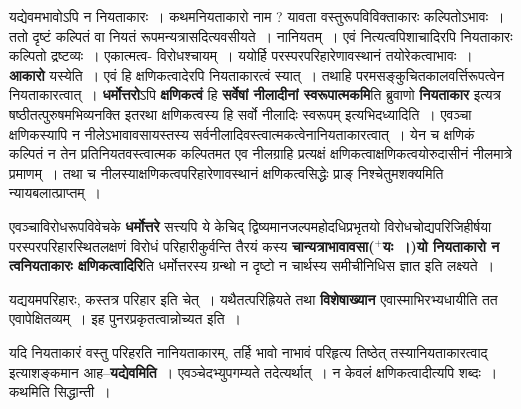 \documentclass[article,12pt,a4paper]{memoir}
\newcommand{\add}[1]{($^{+}$#1)}
\begin{document}
	यद्येवमभावोऽपि न नियताकारः । कथमनियताकारो नाम ? यावता वस्तुरूपविविक्ताकारः कल्पितोऽभावः । ततो दृष्टं कल्पितं वा नियतं रूपमन्यत्रासदित्यवसीयते । नानियतम् । एवं नित्यत्वपिशाचादिरपि नियताकारः कल्पितो द्रष्टव्यः । एकात्मत्व- विरोधश्चायम् । ययोर्हि परस्परपरिहारेणावस्थानं तयोरेकत्वाभावः । \textbf{आकारो} यस्येति । एवं हि क्षणिकत्वादेरपि नियताकारत्वं स्यात् । तथाहि परमसङ्कुचितकालवर्त्तिरूपत्वेन नियताकारत्वात् । \textbf{धर्मोत्तरो}ऽपि \textbf{क्षणिकत्वं} हि \textbf{सर्वेषां नीलादीनां स्वरूपात्मकमि}ति ब्रुवाणो \textbf{नियताकार} इत्यत्र षष्ठीतत्पुरुषमभिव्यनक्ति इतरथा क्षणिकत्वस्य हि सर्वो नीलादिः स्वरूपम् इत्यभिदध्यादिति । एवञ्चा  क्षणिकस्यापि न नीलेऽभावावसायस्तस्य सर्वनीलादिवस्त्वात्मकत्वेनानियताकारत्वात् । येन च क्षणिकं कल्पितं न तेन प्रतिनियतवस्त्वात्मक  कल्पितमत एव नीलग्राहि प्रत्यक्षं क्षणिकत्वाक्षणिकत्वयोरुदासीनं नीलमात्रे प्रमाणम् । तथा च नीलस्याक्षणिकत्वपरिहारेणावस्थानं क्षणिकत्वसिद्धेः प्राङ् निश्चेतुमशक्यमिति न्यायबलात्प्राप्तम् ।
	\pend
      

	  \pstart एवञ्चाविरोधरूपविवेचके \textbf{धर्मोत्तरे} सत्त्यपि ये केचिद् द्विष्यमानजल्पमहोदधिप्रभृतयो विरोधचोद्यपरिजिहीर्षया परस्परपरिहारस्थितलक्षणं विरोधं परिहारीकुर्वन्ति तैरयं कस्य \textbf{चान्यत्राभावावसा\add{यः ।}यो नियताकारो न त्वनियताकारः क्षणिकत्वादिरि}ति धर्मोत्तरस्य ग्रन्थो न दृष्टो न चार्थस्य समीचीनिधिस  ज्ञात इति लक्ष्यते ।
	\pend
      

	  \pstart यद्ययमपरिहारः, कस्तत्र परिहार इति चेत् । यथैतत्परिह्रियते तथा \textbf{विशेषाख्यान} एवास्माभिरभ्यधायीति तत एवापेक्षितव्यम् । इह पुनरप्रकृतत्वान्नोच्यत इति ।
	\pend
      

	  \pstart यदि नियताकारं वस्तु परिहरति नानियताकारम्, तर्हि भावो नाभावं परिहृत्य तिष्ठेत् तस्यानियताकारत्वाद् इत्याशङ्कमान आह--\textbf{यद्येवमिति} । एवञ्चेदभ्युपगम्यते तदेत्यर्थात् । न केवलं क्षणिकत्वादीत्यपि शब्दः । कथमिति सिद्धान्ती ।
	\pend
      
\end{document}

